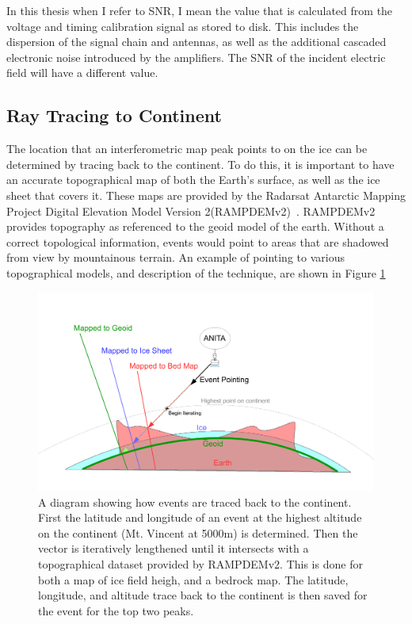 	In this thesis when I refer to SNR, I mean the value that is calculated from the voltage and timing calibration signal as stored to disk.  This includes the dispersion of the signal chain and antennas, as well as the additional cascaded electronic noise introduced by the amplifiers.  The SNR of the incident electric field will have a different value.
	
	
	\subsection{Ray Tracing to Continent}
		 The location that an interferometric map peak points to on the ice can be determined by tracing back to the continent.  To do this, it is important to have an accurate topographical map of both the Earth's surface, as well as the ice sheet that covers it.  These maps are provided by the Radarsat Antarctic Mapping Project Digital Elevation Model Version 2(RAMPDEMv2)~\cite{RAMPDEM}.  RAMPDEMv2 provides topography as referenced to the geoid model of the earth.  Without a correct topological information, events would point to areas that are shadowed from view by mountainous terrain.  An example of pointing to various topographical models, and description of the technique, are shown in Figure \ref{fig:traceBackToContinent}
		 
\begin{figure}
	\centering
	\includegraphics[height=0.5\textheight]{figures/traceBackToContinent}
	\caption{A diagram showing how events are traced back to the continent.  First the latitude and longitude of an event at the highest altitude on the continent (Mt. Vincent at 5000m) is determined.  Then the vector is iteratively lengthened until it intersects with a topographical dataset provided by RAMPDEMv2.  This is done for both a map of ice field heigh, and a bedrock map.  The latitude, longitude, and altitude trace back to the continent is then saved for the event for the top two peaks.} 
	\label{fig:traceBackToContinent}
\end{figure}	 
		
